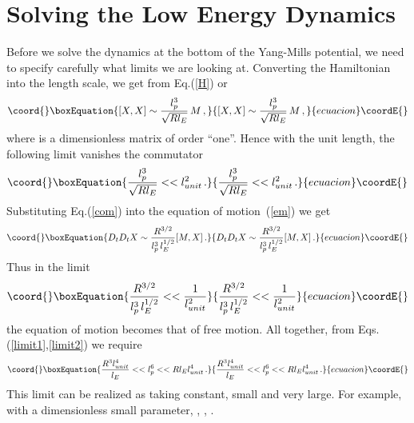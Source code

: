 \documentclass[a4paper,12pt]{article}
\def\tr{\mbox{tr}}
\begin{document}
\section{Solving the Low Energy Dynamics}
Before we solve the dynamics  at the bottom of the Yang-Mills potential, we need to specify carefully what limits
we are looking at. Converting the Hamiltonian into the length scale, \coordHE{}  we get from Eq.(\ref{H})
\myHighlight{$\tr[X,X]^{2}\sim l_{p}^{6}{/(Rl_{E})}$}\coordHE{} or
\begin{equation}\coord{}\boxEquation{
[X,X]\sim\frac{l_{p}^{3}}{\sqrt{Rl_{E}}}\,M\,, \label{com}
}{
[X,X]\sim\frac{l_{p}^{3}}{\sqrt{Rl_{E}}}\,M\,, }{ecuacion}\coordE{}\end{equation}
where \coordHE{} is a dimensionless matrix of order ``one''. Hence with the unit length, \coordHE{}   the following limit
vanishes the commutator
\begin{equation}\coord{}\boxEquation{
\frac{l_{p}^{3}}{\sqrt{Rl_{E}}}<<l_{unit}^{2}\,.
\label{limit1}
}{
\frac{l_{p}^{3}}{\sqrt{Rl_{E}}}<<l_{unit}^{2}\,.
}{ecuacion}\coordE{}\end{equation}
Substituting Eq.(\ref{com}) into the equation of motion~(\ref{em}) we get
\begin{equation}\coord{}\boxEquation{
D_{t}D_{t}X\sim\frac{R^{3/2}}{l_{p}^{3}\,l_{E}^{1/2}}[M,X]\,.
}{
D_{t}D_{t}X\sim\frac{R^{3/2}}{l_{p}^{3}\,l_{E}^{1/2}}[M,X]\,.
}{ecuacion}\coordE{}\end{equation}
Thus in the limit
\begin{equation}\coord{}\boxEquation{
\frac{R^{3/2}}{l_{p}^{3}\,l_{E}^{1/2}}<<\frac{1}{l_{unit}^{2}}
\label{limit2}
}{
\frac{R^{3/2}}{l_{p}^{3}\,l_{E}^{1/2}}<<\frac{1}{l_{unit}^{2}}
}{ecuacion}\coordE{}\end{equation}
the equation of motion  becomes that of free motion.  All together, from Eqs.(\ref{limit1},\ref{limit2}) we
require
\begin{equation}\coord{}\boxEquation{
\frac{R^{3}l_{unit}^{4}}{l_{E}}<<l_{p}^{6}<<Rl_{E}l_{unit}^{4}\,.
}{
\frac{R^{3}l_{unit}^{4}}{l_{E}}<<l_{p}^{6}<<Rl_{E}l_{unit}^{4}\,.
}{ecuacion}\coordE{}\end{equation}
This  limit can be realized  as taking \coordHE{} constant,  \coordHE{} small and \coordHE{} very large. For example, with a dimensionless  small parameter, \coordHE{},  \coordHE{}, \coordHE{}.\newline
\end{document}
